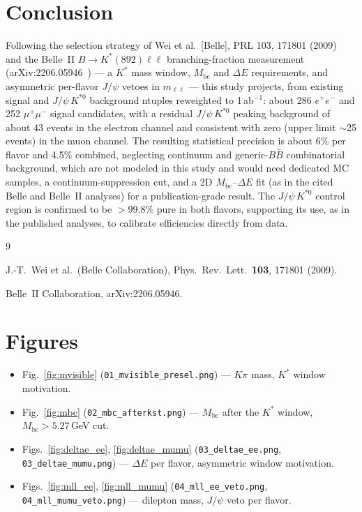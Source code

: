 \documentclass[11pt]{article}
\newcommand{\Kst}{K^{*0}}
\newcommand{\Mbc}{M_{\mathrm{bc}}}
\newcommand{\dE}{\Delta E}
\newcommand{\mll}{m_{\ell\ell}}
\newcommand{\jpsi}{J/\psi}
\begin{document}
\section{Conclusion}

Following the selection strategy of Wei et al.\ [Belle], PRL 103,
171801 (2009)~\cite{Wei:2009} and the Belle~II
$B\to K^{*}(892)\ell\ell$ branching-fraction measurement
(arXiv:2206.05946~\cite{BelleII:2206}) --- a $K^{*}$ mass
window, $\Mbc$ and $\dE$ requirements, and asymmetric per-flavor
$\jpsi$ vetoes in $\mll$ --- this study projects, from existing signal
and $\jpsi\,\Kst$ background ntuples reweighted to 1\,ab$^{-1}$: about
286 $e^+e^-$ and 252 $\mu^+\mu^-$ signal candidates, with a residual
$\jpsi\,\Kst$ peaking background of about 43 events in the electron
channel and consistent with zero (upper limit $\sim$25 events) in the
muon channel. The resulting statistical precision is about 6\% per
flavor and 4.5\% combined, neglecting continuum and generic-$B\bar B$
combinatorial background, which are not modeled in this study and would
need dedicated MC samples, a continuum-suppression cut, and a 2D
$\Mbc$--$\dE$ fit (as in the cited Belle and Belle~II analyses) for a
publication-grade result. The $\jpsi\,\Kst$ control region is confirmed
to be $>$99.8\% pure in both flavors, supporting its use, as in the
published analyses, to calibrate efficiencies directly from data.

\begin{thebibliography}{9}

J.-T.~Wei et al.\ (Belle Collaboration),
Phys.\ Rev.\ Lett.\ \textbf{103}, 171801 (2009).

Belle~II Collaboration, arXiv:2206.05946.

\end{thebibliography}

\section*{Figures}

\begin{itemize}
\item Fig.~\ref{fig:mvisible} (\texttt{01\_mvisible\_presel.png}) ---
  $K\pi$ mass, $K^{*}$ window motivation.
\item Fig.~\ref{fig:mbc} (\texttt{02\_mbc\_afterkst.png}) --- $\Mbc$
  after the $K^{*}$ window, $\Mbc > 5.27$\,GeV cut.
\item Figs.~\ref{fig:deltae_ee}, \ref{fig:deltae_mumu}
  (\texttt{03\_deltae\_ee.png}, \texttt{03\_deltae\_mumu.png}) --- $\dE$
  per flavor, asymmetric window motivation.
\item Figs.~\ref{fig:mll_ee}, \ref{fig:mll_mumu}
  (\texttt{04\_mll\_ee\_veto.png}, \texttt{04\_mll\_mumu\_veto.png}) ---
  dilepton mass, $\jpsi$ veto per flavor.
\end{itemize}
\end{document}
